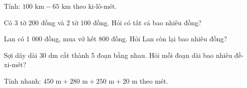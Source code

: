 \begin{ex} %
Tính: $100\text{ km} - 65\text{ km}$ theo ki-lô-mét.
\end{ex}

\begin{ex} %
Có 3 tờ 200 đồng và 2 tờ 100 đồng. Hỏi có tất cả bao nhiêu đồng?
\end{ex}

\begin{ex} %
Lan có 1 000 đồng, mua vở hết 800 đồng. Hỏi Lan còn lại bao nhiêu đồng?
\end{ex}

\begin{ex} %
Sợi dây dài $30\text{ dm}$ cắt thành 5 đoạn bằng nhau. Hỏi mỗi đoạn dài bao nhiêu đề-xi-mét?
\end{ex}

\begin{ex} %
Tính nhanh: $450\text{ m} + 280\text{ m} + 250\text{ m} + 20\text{ m}$ theo mét.
\end{ex}
